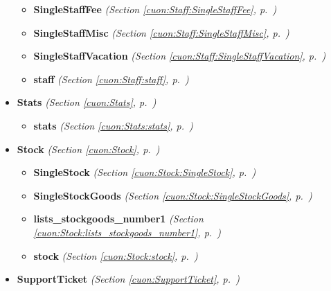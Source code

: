 \begin{itemize}
\begin{itemize}
    \item \textbf{SingleStaffFee}
  \textit{(Section \ref{cuon:Staff:SingleStaffFee}, p.~\pageref{cuon:Staff:SingleStaffFee})}

    \item \textbf{SingleStaffMisc}
  \textit{(Section \ref{cuon:Staff:SingleStaffMisc}, p.~\pageref{cuon:Staff:SingleStaffMisc})}

    \item \textbf{SingleStaffVacation}
  \textit{(Section \ref{cuon:Staff:SingleStaffVacation}, p.~\pageref{cuon:Staff:SingleStaffVacation})}

    \item \textbf{staff}
  \textit{(Section \ref{cuon:Staff:staff}, p.~\pageref{cuon:Staff:staff})}

  \end{itemize}
\item \textbf{Stats}
  \textit{(Section \ref{cuon:Stats}, p.~\pageref{cuon:Stats})}

  \begin{itemize}
\setlength{\parskip}{0ex}
    \item \textbf{stats}
  \textit{(Section \ref{cuon:Stats:stats}, p.~\pageref{cuon:Stats:stats})}

  \end{itemize}
\item \textbf{Stock}
  \textit{(Section \ref{cuon:Stock}, p.~\pageref{cuon:Stock})}

  \begin{itemize}
\setlength{\parskip}{0ex}
    \item \textbf{SingleStock}
  \textit{(Section \ref{cuon:Stock:SingleStock}, p.~\pageref{cuon:Stock:SingleStock})}

    \item \textbf{SingleStockGoods}
  \textit{(Section \ref{cuon:Stock:SingleStockGoods}, p.~\pageref{cuon:Stock:SingleStockGoods})}

    \item \textbf{lists\_stockgoods\_number1}
  \textit{(Section \ref{cuon:Stock:lists_stockgoods_number1}, p.~\pageref{cuon:Stock:lists_stockgoods_number1})}

    \item \textbf{stock}
  \textit{(Section \ref{cuon:Stock:stock}, p.~\pageref{cuon:Stock:stock})}

  \end{itemize}
\item \textbf{SupportTicket}
  \textit{(Section \ref{cuon:SupportTicket}, p.~\pageref{cuon:SupportTicket})}


\end{itemize}
